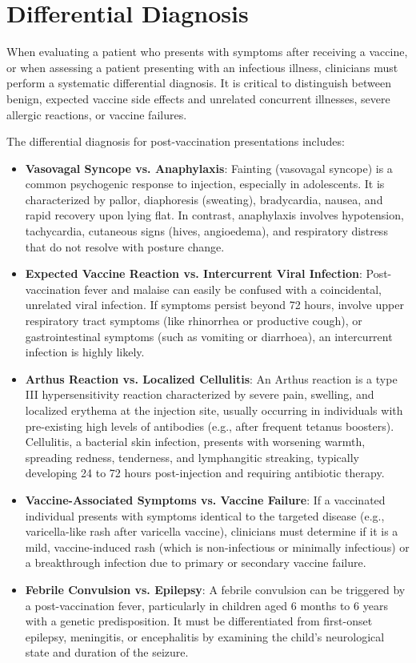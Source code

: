 \section*{Differential Diagnosis}
When evaluating a patient who presents with symptoms after receiving a vaccine, or when assessing a patient presenting with an infectious illness, clinicians must perform a systematic differential diagnosis. It is critical to distinguish between benign, expected vaccine side effects and unrelated concurrent illnesses, severe allergic reactions, or vaccine failures.

The differential diagnosis for post-vaccination presentations includes:
\begin{itemize}
    \item \textbf{Vasovagal Syncope vs. Anaphylaxis}: Fainting (vasovagal syncope) is a common psychogenic response to injection, especially in adolescents. It is characterized by pallor, diaphoresis (sweating), bradycardia, nausea, and rapid recovery upon lying flat. In contrast, anaphylaxis involves hypotension, tachycardia, cutaneous signs (hives, angioedema), and respiratory distress that do not resolve with posture change.
    \item \textbf{Expected Vaccine Reaction vs. Intercurrent Viral Infection}: Post-vaccination fever and malaise can easily be confused with a coincidental, unrelated viral infection. If symptoms persist beyond 72 hours, involve upper respiratory tract symptoms (like rhinorrhea or productive cough), or gastrointestinal symptoms (such as vomiting or diarrhoea), an intercurrent infection is highly likely.
    \item \textbf{Arthus Reaction vs. Localized Cellulitis}: An Arthus reaction is a type III hypersensitivity reaction characterized by severe pain, swelling, and localized erythema at the injection site, usually occurring in individuals with pre-existing high levels of antibodies (e.g., after frequent tetanus boosters). Cellulitis, a bacterial skin infection, presents with worsening warmth, spreading redness, tenderness, and lymphangitic streaking, typically developing 24 to 72 hours post-injection and requiring antibiotic therapy.
    \item \textbf{Vaccine-Associated Symptoms vs. Vaccine Failure}: If a vaccinated individual presents with symptoms identical to the targeted disease (e.g., varicella-like rash after varicella vaccine), clinicians must determine if it is a mild, vaccine-induced rash (which is non-infectious or minimally infectious) or a breakthrough infection due to primary or secondary vaccine failure.
    \item \textbf{Febrile Convulsion vs. Epilepsy}: A febrile convulsion can be triggered by a post-vaccination fever, particularly in children aged 6 months to 6 years with a genetic predisposition. It must be differentiated from first-onset epilepsy, meningitis, or encephalitis by examining the child's neurological state and duration of the seizure.
\end{itemize}


